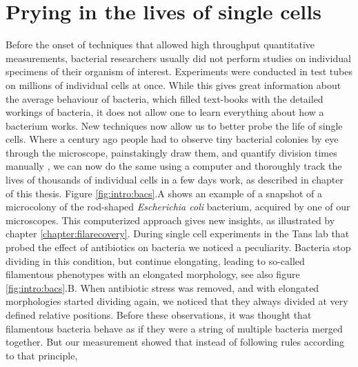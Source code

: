 \section{Prying in the lives of single cells}

%
%
Before the onset of techniques that allowed high throughput quantitative measurements, bacterial researchers usually did not perform studies on individual specimens of their organism of interest.
%
Experiments 
were conducted in test tubes on millions of individual cells at once.
%
While this gives great information about the average behaviour of bacteria, 
which filled text-books with the detailed workings of bacteria,
it does not allow one to learn everything about how a bacterium works.
%
%
New techniques now allow us to better probe the life of single cells.
%
Where a century ago people had to observe tiny bacterial colonies by eye through the microscope, painstakingly draw them, and quantify division times manually \cite{Kelly1932},
we can now do the same using a computer and 
thoroughly track the lives of thousands of individual cells in a few days work, as described in chapter \cite{chapter:methods} of this thesis.
%
Figure \ref{fig:intro:bacs}.A shows an example of a snapshot of a microcolony of the rod-shaped \textit{Escherichia coli} bacterium, acquired by one of our microscopes.
%
This computerized approach gives new insights, as illustrated by chapter \ref{chapter:filarecovery}.
%
During single cell experiments in the Tans lab that probed the effect of antibiotics on \ecoli bacteria \cite{RozendaalVerslagXXX} we noticed a peculiarity.
%
Bacteria stop dividing in this condition, but continue elongating, leading to so-called filamentous phenotypes with an elongated morphology, see also figure \ref{fig:intro:bacs}.B.
%
When antibiotic stress was removed, and \ecoli with elongated morphologies started dividing again, 
we noticed that 
they always divided at very defined relative positions.
%
Before these observations, it was thought that filamentous bacteria behave as if they were a string of multiple bacteria merged together.
%
But our measurement showed that instead of following rules according to that principle, 
